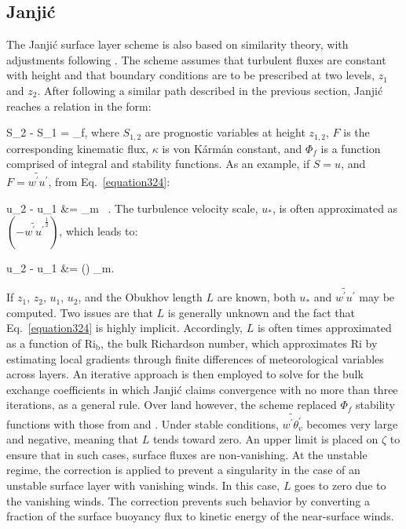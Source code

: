 \subsection{Janji\'{c}}
\label{sl-janjic-352}

The Janji\'{c} surface layer scheme is also based on  \citet{MO} similarity theory, with adjustments following  \citet{Jan94,Jan96,Jan02}. The scheme assumes that turbulent fluxes are constant with height and that boundary conditions are to be prescribed at two levels, $z_1$ and $z_2$. After following a similar path described in the previous section, Janji\'{c} reaches a relation in the form:

\be
S_2 - S_1 =  \Phi_f, \label{equation324}
\ee
\noindent
 where $S_{1,2}$ are prognostic variables at height $z_{1,2}$, $F$ is the corresponding kinematic flux, $\kappa$ is von K\'{a}rm\'{a}n constant, and $\Phi_f$ is a function comprised of integral and stability functions. As an example, if $S=u$, and $F=\widetilde{w^{\prime}u^{\prime}}$, from Eq.~\eqref{equation324}:

\bse \label{equation325}
\bal
u_2 - u_1 &= \Phi_m \, .
\eal
\ese
\noindent
 The turbulence velocity scale, $u_*$, is often approximated as $(-\widetilde{w^{'}u^{'}}^\frac{1}{2})$, which leads to:

\bse
\bal
u_2 - u_1 &= \left(\right) \Phi_m. \label{equation326}
\eal
\ese


If $z_1$, $z_2$, $u_1$, $u_2$, and the Obukhov length $L$ are known, both $u_*$ and $\widetilde{w^{\prime}u^{\prime}}$ may be computed. Two issues are that $L$ is generally unknown and the fact that Eq.~\eqref{equation324} is highly implicit. Accordingly, $L$ is often times approximated as a function of $\mathrm{Ri_b}$, the bulk Richardson number, which approximates $\mathrm{Ri}$ by estimating local gradients through finite differences of meteorological variables across layers. An iterative approach is then employed to solve for the bulk exchange coefficients in which Janji\'{c} claims convergence with no more than three iterations, as a general rule. Over land however, the scheme replaced $\Phi_f$ stability functions with those from  \citet{Dyer} and  \citet{Paulson}. Under stable conditions, $\widetilde{w^{'}\theta_v^{'}}$ becomes very large and negative, meaning that $L$ tends toward zero. An upper limit is placed on $\zeta$ to ensure that in such cases, surface fluxes are non-vanishing. At the unstable regime, the  \citet{Beljaars} correction is applied to prevent a singularity in the case of an unstable surface layer with vanishing winds. In this case, $L$ goes to zero due to the vanishing winds. The correction prevents such behavior by converting a fraction of the surface buoyancy flux to kinetic energy of the near-surface winds. 

